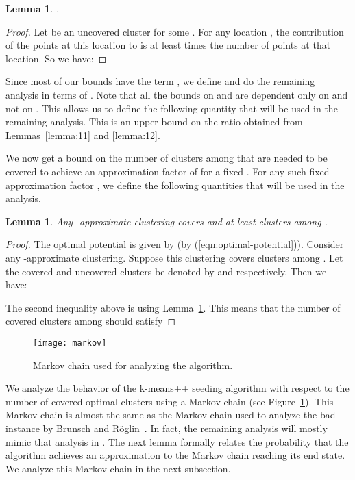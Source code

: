 \documentclass[11pt]{article}
\newtheorem{lemma}[theorem]{Lemma}
\begin{document}
\begin{lemma}\label{lemma:13}
.
\end{lemma}
\begin{proof}
Let  be an uncovered cluster for some .
For any location , the contribution of the points at this location to  is at least  times the number of points at that location. So we have:

\end{proof}

Since most of our bounds have the term , we define  and do the remaining analysis in terms of .
Note that all the bounds on  and  are dependent only on  and not on .
This allows us to define the following quantity that will be used in the remaining analysis. 
This is an upper bound on the ratio  obtained from Lemmas~\ref{lemma:11} and \ref{lemma:12}.


We now get a bound on the number of clusters among  that are needed to be covered to achieve an approximation factor of  for a fixed .
For any such fixed approximation factor , we define the following quantities that will be used in the analysis.





\begin{lemma}
Any -approximate clustering covers  and at least  clusters among .
\end{lemma}
\begin{proof}
The optimal potential is given by  (by (\ref{eqn:optimal-potential})).
Consider any -approximate clustering. 
Suppose this clustering covers  clusters among . 
Let the covered and uncovered clusters be denoted by  and  respectively.
Then we have:

The second inequality above is using Lemma~\ref{lemma:13}.
This means that the number of covered clusters among  should satisfy

\end{proof}


\begin{figure}
\centering
\texttt{[image: markov]}
\caption{Markov chain used for analyzing the algorithm.}
\label{fig:2}
\end{figure}



We analyze the behavior of the k-means++ seeding algorithm with respect to the number of covered optimal clusters using a Markov chain (see Figure~\ref{fig:2}). 
This Markov chain is almost the same as the Markov chain used to analyze the bad instance by Brunsch and R\"{o}glin~\cite{br12}.
In fact, the remaining analysis will mostly mimic that analysis in \cite{br12}. 
The next lemma formally relates the probability that the algorithm achieves an  approximation to the Markov chain reaching its end state.
We analyze this Markov chain in the next subsection.
\end{document}
